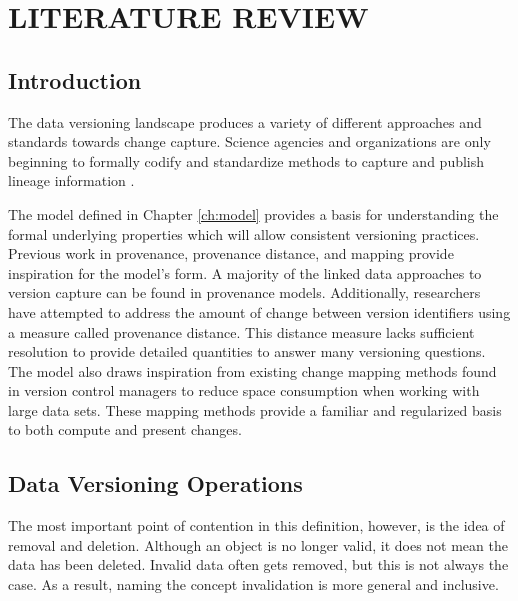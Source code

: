 
\chapter{LITERATURE REVIEW}\label{ch:prevwork}

\section{Introduction}

The data versioning landscape produces a variety of different approaches and standards towards change capture.
Science agencies and organizations are only beginning to formally codify and standardize methods to capture and publish lineage information \cite{MatthewS.Mayernik201312-039}.

The model defined in Chapter \ref{ch:model} provides a basis for understanding the formal underlying properties which will allow consistent versioning practices.
Previous work in provenance, provenance distance, and mapping provide inspiration for the model's form.
A majority of the linked data approaches to version capture can be found in provenance models.
Additionally, researchers have attempted to address the amount of change between version identifiers using a measure called provenance distance.
This distance measure lacks sufficient resolution to provide detailed quantities to answer many versioning questions.
The model also draws inspiration from existing change mapping methods found in version control managers to reduce space consumption when working with large data sets.
These mapping methods provide a familiar and regularized basis to both compute and present changes.

\section{Data Versioning Operations}

The most important point of contention in this definition, however, is the idea of removal and deletion.
Although an object is no longer valid, it does not mean the data has been deleted.
Invalid data often gets removed, but this is not always the case.
As a result, naming the concept invalidation is more general and inclusive.


